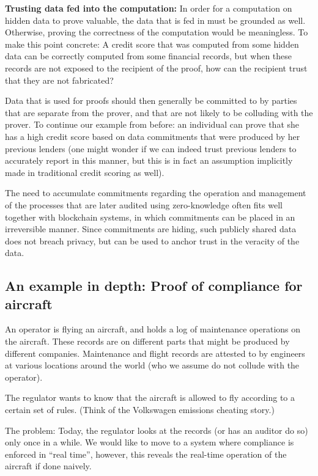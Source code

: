 \textbf{Trusting data fed into the computation: }
In order for a computation on hidden data to prove valuable, the data that is fed in must be grounded as well. 
Otherwise, proving the correctness of the computation would be meaningless. 
To make this point concrete: A credit score that was computed from some hidden data can be correctly computed from some financial records, but when these records are not exposed to the recipient of the proof, how can the recipient trust that they are not fabricated? 

Data that is used for proofs should then generally be committed to by parties that are separate from the prover, and that are not likely to be colluding with the prover. 
To continue our example from before: 
an individual can prove that she has a high credit score based on data commitments that were produced by her previous lenders (one might wonder if we can indeed trust previous lenders to accurately report in this manner, but this is in fact an assumption implicitly made in traditional credit scoring as well).   

The need to accumulate commitments regarding the operation and management of the processes that are later audited using zero-knowledge often fits well together with blockchain systems, in which commitments can be placed in an irreversible manner. 
Since commitments are hiding, such publicly shared data does not breach privacy, but can be used to anchor trust in the veracity of the data. 


\subsection{An example in depth: Proof of compliance for aircraft}
\label{apps:regulation-compliance:example-compliance-aircraft}

An operator is flying an aircraft, and holds a log of maintenance operations on the aircraft.  
These records are on different parts that might be produced by different companies.
Maintenance and flight records are attested to by engineers at various locations around the world (who we assume do not collude with the operator). 

The regulator wants to know that the aircraft is allowed to fly according to a certain set of rules.
(Think of the Volkswagen emissions cheating story.)

The problem: Today, the regulator looks at the records (or has an auditor do so) only once in a while. We would like to move to a system where compliance is enforced in “real time”, however, this reveals the real-time operation of the aircraft if done naively.

